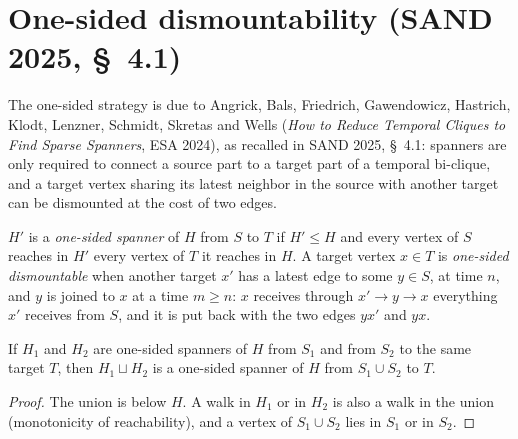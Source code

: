 \section*{One-sided dismountability (SAND 2025, \S~4.1)}

The one-sided strategy is due to Angrick, Bals, Friedrich, Gawendowicz,
Hastrich, Klodt, Lenzner, Schmidt, Skretas and Wells (\emph{How to Reduce
Temporal Cliques to Find Sparse Spanners}, ESA 2024), as recalled in SAND 2025,
\S~4.1: spanners are only required to connect a source part to a target part
of a temporal bi-clique, and a target vertex sharing its latest neighbor in
the source with another target can be dismounted at the cost of two edges.

\begin{definition}
  \label{def:spanner-from-to}
  \leanok
  $H'$ is a \emph{one-sided spanner} of $H$ from $S$ to $T$ if $H' \le H$ and
  every vertex of $S$ reaches in $H'$ every vertex of $T$ it reaches in $H$.
  A target vertex $x \in T$ is \emph{one-sided dismountable} when another
  target $x'$ has a latest edge to some $y \in S$, at time $n$, and $y$ is
  joined to $x$ at a time $m \ge n$: $x$ receives through $x' \to y \to x$
  everything $x'$ receives from $S$, and it is put back with the two edges
  $yx'$ and $yx$.
\end{definition}

\begin{lemma}[Split]
  \label{lem:spanner-from-to-sup}
  \leanok
  If $H_1$ and $H_2$ are one-sided spanners of $H$ from $S_1$ and from $S_2$
  to the same target $T$, then $H_1 \sqcup H_2$ is a one-sided spanner of $H$
  from $S_1 \cup S_2$ to $T$.
\end{lemma}

\begin{proof}
  \leanok
  The union is below $H$. A walk in $H_1$ or in $H_2$ is also a walk in the union (monotonicity of reachability), and a vertex of $S_1 \cup S_2$ lies in $S_1$ or in $S_2$.
\end{proof}

